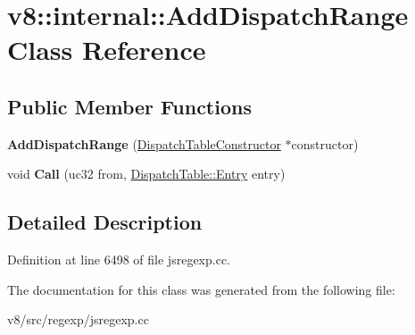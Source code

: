 \hypertarget{classv8_1_1internal_1_1AddDispatchRange}{}\section{v8\+:\+:internal\+:\+:Add\+Dispatch\+Range Class Reference}
\label{classv8_1_1internal_1_1AddDispatchRange}
\subsection*{Public Member Functions}
\begin{DoxyCompactItemize}
\item 
\mbox{\label{classv8_1_1internal_1_1AddDispatchRange_aabb3eb748f5a566349ae5946fef1103b}} 
{\bfseries Add\+Dispatch\+Range} (\mbox{\hyperlink{classv8_1_1internal_1_1DispatchTableConstructor}{Dispatch\+Table\+Constructor}} $\ast$constructor)
\item 
\mbox{\label{classv8_1_1internal_1_1AddDispatchRange_a17e1406e159be04ef2b1fcc36d94c888}} 
void {\bfseries Call} (uc32 from, \mbox{\hyperlink{classv8_1_1internal_1_1DispatchTable_1_1Entry}{Dispatch\+Table\+::\+Entry}} entry)
\end{DoxyCompactItemize}


\subsection{Detailed Description}


Definition at line 6498 of file jsregexp.\+cc.



The documentation for this class was generated from the following file\+:\begin{DoxyCompactItemize}
\item 
v8/src/regexp/jsregexp.\+cc\end{DoxyCompactItemize}

